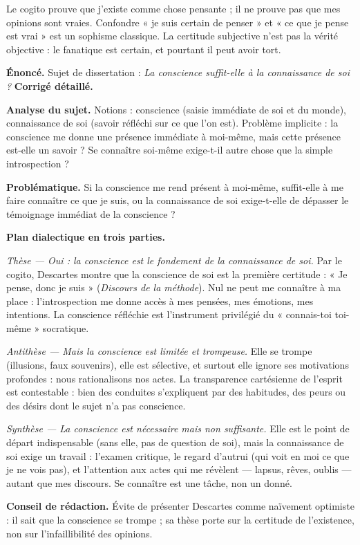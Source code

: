 \documentclass[11pt]{article}
\newcommand{\cle}[1]{{\popxbold\color{popdark}#1}}
\begin{document}
\begin{attention}
Le cogito prouve que j'existe comme chose pensante ; il ne prouve pas que mes opinions sont vraies. Confondre « je suis certain de penser » et « ce que je pense est vrai » est un sophisme classique. La certitude subjective n'est pas la vérité objective : le fanatique est certain, et pourtant il peut avoir tort.
\end{attention}

\begin{exoresolu}
\textbf{Énoncé.} Sujet de dissertation : \emph{La conscience suffit-elle à la connaissance de soi ?}
\tcblower
\textbf{Corrigé détaillé.}
\par
\textbf{Analyse du sujet.} Notions : \cle{conscience} (saisie immédiate de soi et du monde), \cle{connaissance de soi} (savoir réfléchi sur ce que l'on est). Problème implicite : la conscience me donne une présence immédiate à moi-même, mais cette présence est-elle un savoir ? Se connaître soi-même exige-t-il autre chose que la simple introspection ?
\par
\textbf{Problématique.} Si la conscience me rend présent à moi-même, suffit-elle à me faire connaître ce que je suis, ou la connaissance de soi exige-t-elle de dépasser le témoignage immédiat de la conscience ?
\par
\textbf{Plan dialectique en trois parties.}
\par
\emph{Thèse — Oui : la conscience est le fondement de la connaissance de soi.} Par le cogito, Descartes montre que la conscience de soi est la première certitude : « Je pense, donc je suis » (\emph{Discours de la méthode}). Nul ne peut me connaître à ma place : l'introspection me donne accès à mes pensées, mes émotions, mes intentions. La conscience réfléchie est l'instrument privilégié du « connais-toi toi-même » socratique.
\par
\emph{Antithèse — Mais la conscience est limitée et trompeuse.} Elle se trompe (illusions, faux souvenirs), elle est sélective, et surtout elle ignore ses motivations profondes : nous rationalisons nos actes. La transparence cartésienne de l'esprit est contestable : bien des conduites s'expliquent par des habitudes, des peurs ou des désirs dont le sujet n'a pas conscience.
\par
\emph{Synthèse — La conscience est nécessaire mais non suffisante.} Elle est le point de départ indispensable (sans elle, pas de question de soi), mais la connaissance de soi exige un travail : l'examen critique, le regard d'autrui (qui voit en moi ce que je ne vois pas), et l'attention aux actes qui me révèlent — lapsus, rêves, oublis — autant que mes discours. Se connaître est une tâche, non un donné.
\par
\textbf{Conseil de rédaction.} Évite de présenter Descartes comme naïvement optimiste : il sait que la conscience se trompe ; sa thèse porte sur la certitude de l'existence, non sur l'infaillibilité des opinions.
\end{exoresolu}
\end{document}
